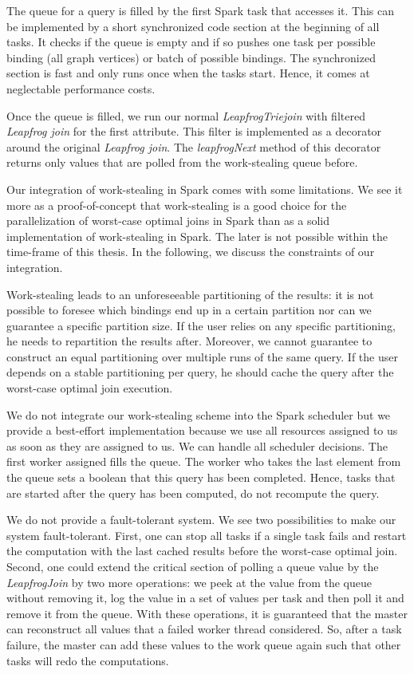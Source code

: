 The queue for a query is filled by the first Spark task that accesses it.
This can be implemented by a short synchronized code section at the beginning of all tasks.
It checks if the queue is empty and if so pushes one task per possible binding (all graph vertices) or batch of possible bindings.
The synchronized section is fast and only runs once when the tasks start.
Hence, it comes at neglectable performance costs.

Once the queue is filled, we run our normal \textit{LeapfrogTriejoin} with filtered \textit{Leapfrog join} for the first attribute.
This filter is implemented as a decorator around the original \textit{Leapfrog join}.
The \textit{leapfrogNext} method of this decorator returns only values that are polled from the work-stealing queue before.

Our integration of work-stealing in Spark comes with some limitations.
We see it more as a proof-of-concept that work-stealing is a good choice for the parallelization of worst-case optimal joins in Spark than
as a solid implementation of work-stealing in Spark.
The later is not possible within the time-frame of this thesis.
In the following, we discuss the constraints of our integration.

Work-stealing leads to an unforeseeable partitioning of the results: it is not possible to foresee which bindings end up in a certain
partition nor can we guarantee a specific partition size.
If the user relies on any specific partitioning, he needs to repartition the results after.
Moreover, we cannot guarantee to construct an equal partitioning over multiple runs of the same query.
If the user depends on a stable partitioning per query, he should cache the query after the worst-case optimal join execution.


We do not integrate our work-stealing scheme into the Spark scheduler but we provide a best-effort implementation because
we use all resources assigned to us as soon as they are assigned to us.
We can handle all scheduler decisions.
The first worker assigned fills the queue.
The worker who takes the last element from the queue sets a boolean that this query has been completed.
Hence, tasks that are started after the query has been computed, do not recompute the query.

We do not provide a fault-tolerant system.
We see two possibilities to make our system fault-tolerant.
First, one can stop all tasks if a single task fails and restart the computation with the last cached results before the worst-case
optimal join.
Second, one could extend the critical section of polling a queue value by the \textit{LeapfrogJoin} by two more operations: we peek
at the value from the queue without removing it, log the value in a set of values per task and then poll it and remove it from the queue.
With these operations, it is guaranteed that the master can reconstruct all values that a failed worker thread considered.
So, after a task failure, the master can add these values to the work queue again such that other tasks will redo the computations.
